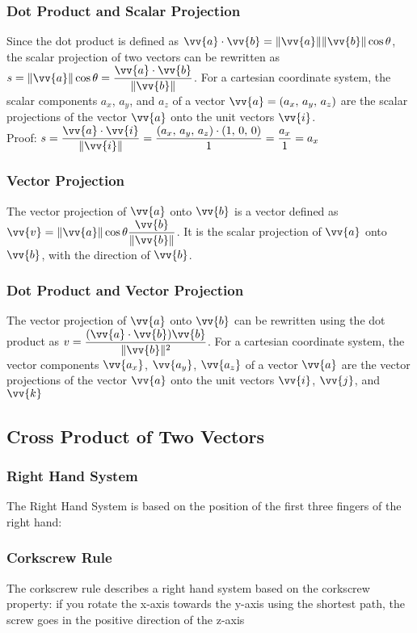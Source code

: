 \documentclass{article}
\newcommand{\mv}[1]{
	\lVert\vv{#1}\rVert
}
\begin{document}
	\subsubsection{Dot Product and Scalar Projection}
	Since the dot product is defined as $\vv{a}\cdot\vv{b}=\mv{a}\mv{b}\cos\theta$, the scalar projection of two vectors can be rewritten as $s=\mv{a}\cos\theta=\dfrac{\vv{a}\cdot\vv{b}}{\mv{b}}$. For a cartesian coordinate system, the scalar components $a_x$, $a_y$, and $a_z$ of a vector $\vv{a}=(a_x,\,a_y,\,a_z)$ are the scalar projections of the vector $\vv{a}$ onto the unit vectors $\vv{i}$.\\Proof: $s=\dfrac{\vv{a}\cdot\vv{i}}{\mv{i}}=\dfrac{(a_x,\,a_y,\,a_z)\cdot(1,\,0,\,0)}{1}=\dfrac{a_x}{1}=a_x$
	\subsubsection{Vector Projection}
	The vector projection of $\vv{a}$ onto $\vv{b}$ is a vector defined as $\vv{v}=\mv{a}\cos\theta\dfrac{\vv{b}}{\mv{b}}$. It is the scalar projection of $\vv{a}$ onto $\vv{b}$, with the direction of $\vv{b}$.
	\subsubsection{Dot Product and Vector Projection}
	The vector projection of $\vv{a}$ onto $\vv{b}$ can be rewritten using the dot product as $v=\dfrac{(\vv{a}\cdot\vv{b})\vv{b}}{\mv{b}^2}$. For a cartesian coordinate system, the vector components $\vv{a_x}$, $\vv{a_y}$, $\vv{a_z}$ of a vector $\vv{a}$ are the vector projections of the vector $\vv{a}$ onto the unit vectors $\vv{i}$, $\vv{j}$, and $\vv{k}$
	\subsection{Cross Product of Two Vectors}
	\subsubsection{Right Hand System}
	The Right Hand System is based on the position of the first three fingers of the right hand: %
	\subsubsection{Corkscrew Rule}
	The corkscrew rule describes a right hand system based on the corkscrew property: if you rotate the x-axis towards the y-axis using the shortest path, the screw goes in the positive direction of the z-axis
\end{document}
